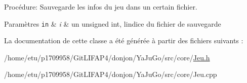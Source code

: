 Procédure\+: Sauvegarde les infos du jeu dans un certain fichier. 


\begin{DoxyParams}[1]{Paramètres}
\mbox{\tt in}  & {\em i} & un unsigned int, l\textquotesingle{}indice du fichier de sauvegarde \\
\hline
\end{DoxyParams}


La documentation de cette classe a été générée à partir des fichiers suivants \+:\begin{DoxyCompactItemize}
\item 
/home/etu/p1709958/\+Git\+L\+I\+F\+A\+P4/donjon/\+Ya\+Ju\+Go/src/core/\mbox{\hyperlink{Jeu_8h}{Jeu.\+h}}\item 
/home/etu/p1709958/\+Git\+L\+I\+F\+A\+P4/donjon/\+Ya\+Ju\+Go/src/core/Jeu.\+cpp\end{DoxyCompactItemize}
